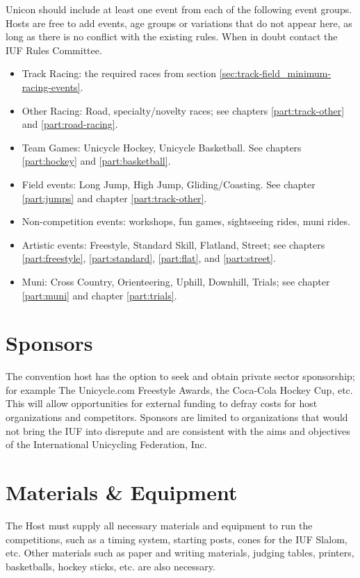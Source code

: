 Unicon should include at least one event from each of the following event groups. 
Hosts are free to add events, age groups or variations that do not appear here, as long as there is no conflict with the existing rules. 
When in doubt contact the IUF Rules Committee.
\begin{itemize}
  \item Track Racing: the required races from section \ref{sec:track-field_minimum-racing-events}.
  \item Other Racing: Road, specialty/novelty races; see chapters \ref{part:track-other} and \ref{part:road-racing}.
  \item Team Games: Unicycle Hockey, Unicycle Basketball. See chapters \ref{part:hockey} and \ref{part:basketball}.
  \item Field events: Long Jump, High Jump, Gliding/Coasting. See chapter \ref{part:jumps} and chapter \ref{part:track-other}.
  \item Non-competition events: workshops, fun games, sightseeing rides, muni rides.
  \item Artistic events: Freestyle, Standard Skill, Flatland, Street; see chapters \ref{part:freestyle}, \ref{part:standard}, \ref{part:flat}, and \ref{part:street}.
  \item Muni: Cross Country, Orienteering, Uphill, Downhill, Trials; see chapter \ref{part:muni} and chapter \ref{part:trials}.
\end{itemize}

\section{Sponsors}

The convention host has the option to seek and obtain private sector sponsorship; for example The Unicycle.com Freestyle Awards, the Coca-Cola Hockey Cup, etc. 
This will allow opportunities for external funding to defray costs for host organizations and competitors. 
Sponsors are limited to organizations that would not bring the IUF into disrepute and are consistent with the aims and objectives of the International Unicycling Federation, Inc.

\section{Materials \& Equipment}
The Host must supply all necessary materials and equipment to run the competitions, such as a timing system, starting posts, cones for the IUF Slalom, etc.
Other materials such as paper and writing materials, judging tables, printers, basketballs, hockey sticks, etc. are also necessary.

